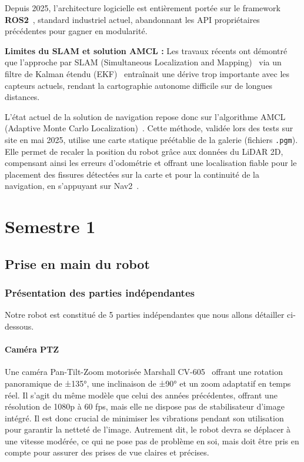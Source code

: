 \documentclass[12pt,a4paper]{article}
\begin{document}
Depuis 2025, l'architecture logicielle est entièrement portée sur le framework \textbf{ROS2}~\cite{ros2}, standard industriel actuel, abandonnant les API propriétaires précédentes pour gagner en modularité.

\textbf{Limites du SLAM et solution AMCL :}
Les travaux récents ont démontré que l'approche par SLAM (Simultaneous Localization and Mapping)~\cite{slam_toolbox} via un filtre de Kalman étendu (EKF)~\cite{robot_localization} entraînait une dérive trop importante avec les capteurs actuels, rendant la cartographie autonome difficile sur de longues distances.

L'état actuel de la solution de navigation repose donc sur l'algorithme AMCL (Adaptive Monte Carlo Localization)~\cite{nav2_amcl_docs}. Cette méthode, validée lors des tests sur site en mai 2025, utilise une carte statique préétablie de la galerie (fichiers \texttt{.pgm}). Elle permet de recaler la position du robot grâce aux données du LiDAR 2D, compensant ainsi les erreurs d'odométrie et offrant une localisation fiable pour le placement des fissures détectées sur la carte et pour la continuité de la navigation, en s'appuyant sur Nav2~\cite{nav2}.


\section{Semestre 1}

\subsection{Prise en main du robot}

\subsubsection{Présentation des parties indépendantes}
Notre robot est constitué de 5 parties indépendantes que nous allons détailler ci-dessous. 

\paragraph{Caméra PTZ}
Une caméra Pan-Tilt-Zoom motorisée Marshall CV-605~\cite{marshall_cv605} offrant une rotation panoramique de ±135°, une inclinaison de ±90° et un zoom adaptatif en temps réel. Il s'agit du même modèle que celui des années précédentes, offrant une résolution de 1080p à 60 fps, mais elle ne dispose pas de stabilisateur d'image intégré. Il est donc crucial de minimiser les vibrations pendant son utilisation pour garantir la netteté de l'image. Autrement dit, le robot devra se déplacer à une vitesse modérée, ce qui ne pose pas de problème en soi, mais doit être pris en compte pour assurer des prises de vue claires et précises.
\end{document}
